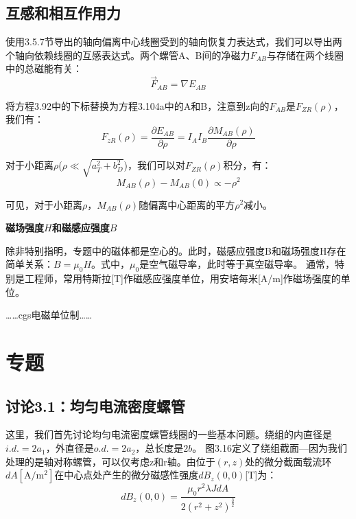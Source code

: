 \subsection{互感和相互作用力}
使用3.5.7节导出的轴向偏离中心线圈受到的轴向恢复力表达式，我们可以导出两个轴向依赖线圈的互感表达式。两个螺管A、B间的净磁力$F_{AB}$与存储在两个线圈中的总磁能有关：
\begin{equation}
\overrightarrow{F}_{AB}=\nabla E_{AB}%
\end{equation}

将方程3.92中的下标替换为方程3.104a中的A和B，注意到z向的$F_{AB}$是$F_{ZR}(\rho)$，我们有：
\begin{equation}
F_{zR}(\rho)=\frac{\partial E_{AB}}{\partial \rho}=I_AI_B\frac{\partial M_{AB}(\rho)}{\partial \rho}%
\end{equation}

对于小距离$\rho$($\rho\ll \sqrt{a_T^2+b_D^2}$)，我们可以对$F_{ZR}(\rho)$积分，有：
\begin{equation}
M_{AB}(\rho)-M_{AB}(0)\propto-\rho^2%
\end{equation}

可见，对于小距离$\rho$，$M_{AB}(\rho)$随偏离中心距离的平方$\rho^2$减小。 


\textbf{磁场强度$H$和磁感应强度$B$}

除非特别指明，专题中的磁体都是空心的。此时，磁感应强度B和磁场强度H存在简单关系：$B=\mu_0 H$。式中，$\mu_0$是空气磁导率，此时等于真空磁导率。
通常，特别是工程师，常用特斯拉[T]作磁感应强度单位，用安培每米[A/m]作磁场强度的单位。

……cgs电磁单位制……

\newpage
\section{专题}
\subsection{讨论3.1：均匀电流密度螺管}

这里，我们首先讨论均匀电流密度螺管线圈的一些基本问题。绕组的内直径是$i.d.=2a_1$，外直径是$o.d.=2a_2$，总长度是$2b$。
图3.16定义了绕组截面---因为我们处理的是轴对称螺管，可以仅考虑z和r轴。由位于$(r,z)$处的微分截面载流环$dA \mathrm{[A/m^2]}$在中心点处产生的微分磁感性强度$dB_z(0, 0)$[T]为：
\begin{equation}
dB_z(0,0)=\frac{\mu_0r^2\lambda JdA}{2(r^2+z^2)^\frac{3}{2}}%
\end{equation}


